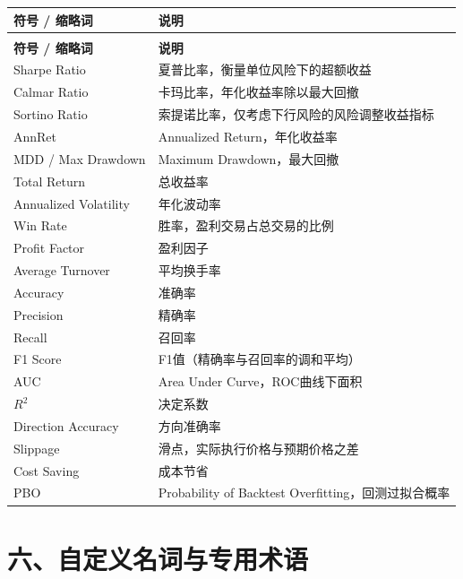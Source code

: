 \begin{longtable}{>{\raggedright\arraybackslash}p{4cm} p{10cm}}
\toprule
\textbf{符号 / 缩略词} & \textbf{说明} \\
\midrule
\endfirsthead
\multicolumn{2}{c}{\tablename\ -- 续表} \\
\toprule
\textbf{符号 / 缩略词} & \textbf{说明} \\
\midrule
\endhead
\bottomrule
\endlastfoot

Sharpe Ratio & 夏普比率，衡量单位风险下的超额收益 \\
Calmar Ratio & 卡玛比率，年化收益率除以最大回撤 \\
Sortino Ratio & 索提诺比率，仅考虑下行风险的风险调整收益指标 \\
AnnRet & Annualized Return，年化收益率 \\
MDD / Max Drawdown & Maximum Drawdown，最大回撤 \\
Total Return & 总收益率 \\
Annualized Volatility & 年化波动率 \\
Win Rate & 胜率，盈利交易占总交易的比例 \\
Profit Factor & 盈利因子 \\
Average Turnover & 平均换手率 \\
Accuracy & 准确率 \\
Precision & 精确率 \\
Recall & 召回率 \\
F1 Score & F1值（精确率与召回率的调和平均） \\
AUC & Area Under Curve，ROC曲线下面积 \\
$R^2$ & 决定系数 \\
Direction Accuracy & 方向准确率 \\
Slippage & 滑点，实际执行价格与预期价格之差 \\
Cost Saving & 成本节省 \\
PBO & Probability of Backtest Overfitting，回测过拟合概率 \\
\end{longtable}

\section*{六、自定义名词与专用术语}

